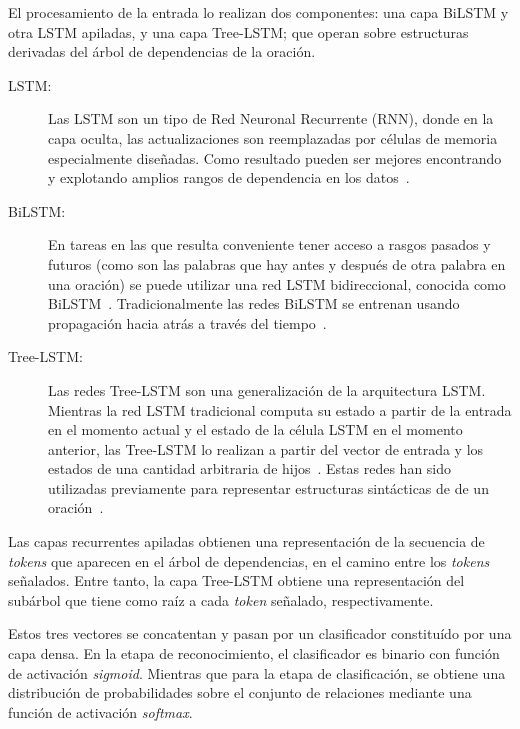 El procesamiento de la entrada lo realizan dos componentes: una capa BiLSTM y otra LSTM apiladas, y una capa Tree-LSTM; que operan sobre estructuras derivadas del árbol de dependencias de la oración.

\begin{description}
	\item[LSTM:] Las LSTM son un tipo de Red Neuronal Recurrente (RNN), donde en la capa oculta, las actualizaciones son reemplazadas por células de memoria especialmente diseñadas.
	Como resultado pueden ser mejores encontrando y explotando amplios rangos de dependencia en los datos~\cite{hochreiter1997long}.
	
	\item[BiLSTM:] En tareas en las que resulta conveniente tener acceso a rasgos pasados y futuros (como son las palabras que hay antes y después de otra palabra en una oración) se puede utilizar una red LSTM bidireccional, conocida como BiLSTM~\cite{graves2013speech}.
	Tradicionalmente las redes BiLSTM se entrenan usando propagación hacia atrás a través del tiempo~\cite{boden2002guide}.
	
	\item[Tree-LSTM:]
	Las redes Tree-LSTM son una generalización de la arquitectura LSTM. 
	Mientras la red LSTM tradicional computa su estado a partir de la entrada en el momento actual y el estado de la célula LSTM en el momento anterior, las Tree-LSTM lo realizan a partir del vector de entrada y los estados de una cantidad arbitraria de hijos~\cite{tai2015improved}.
	Estas redes han sido utilizadas previamente para representar estructuras sintácticas de de un oración~\cite{miwa2016end}.
	
\end{description}

Las capas recurrentes apiladas obtienen una representación de la secuencia de \textit{tokens} que aparecen en el árbol de dependencias, en el camino entre los \textit{tokens} señalados.
Entre tanto, la capa Tree-LSTM obtiene una representación del subárbol que tiene como raíz a cada \textit{token} señalado, respectivamente.

Estos tres vectores se concatentan y pasan por un clasificador constituído por una capa densa. 
En la etapa de reconocimiento, el clasificador es binario con función de activación \textit{sigmoid}.
Mientras que para la etapa de clasificación, se obtiene una distribución de probabilidades sobre el conjunto de relaciones mediante una función de activación \textit{softmax}.

